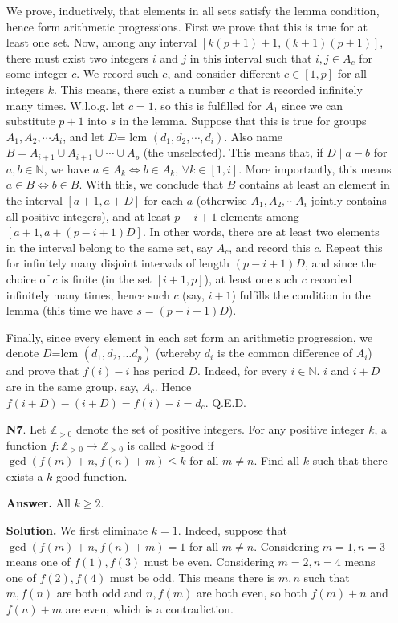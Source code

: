 \documentclass[11pt,a4paper]{article}
\begin{document}
\begin{enumerate}
We prove, inductively, that elements in all sets satisfy the lemma condition, hence form arithmetic progressions. First we prove that this is true for at least one set. Now, among any interval $[k(p+1)+1, (k+1)(p+1)]$, there must exist two integers $i$ and $j$ in this interval such that $i,j\in A_c$ for some integer $c$. We record such $c$, and consider different $c\in[1,p]$ for all integers $k$. This means, there exist a number $c$ that is recorded infinitely many times. W.l.o.g. let $c=1$, so this is fulfilled for $A_1$ since we can substitute $p+1$ into $s$ in the lemma. Suppose that this is true for groups $A_1, A_2,\cdots A_i$, and let $D$= lcm $(d_1, d_2,\cdots , d_i)$. Also name $B=A_{i+1}\cup A_{i+1}\cup\cdots\cup A_{p}$ (the unselected). This means that, if $D\mid a-b$ for $a, b\in\mathbb{N}$, we have $a\in A_{k}\Leftrightarrow b\in A_{k}$, $\forall k\in [1,i]$. More importantly, this means $a\in B\Leftrightarrow b\in B$. With this, we conclude that $B$ contains at least an element in the interval $[a+1, a+D]$ for each $a$ (otherwise $A_1, A_2,\cdots A_i$ jointly contains all positive integers), and at least $p-i+1$ elements among $[a+1, a+(p-i+1)D]$. In other words, there are at least two elements in the interval belong to the same set, say $A_c$, and record this $c$. Repeat this for infinitely many disjoint intervals of length $(p-i+1)D$, and since the choice of $c$ is finite (in the set $[i+1, p]$), at least one such $c$ recorded infinitely many times, hence such $c$ (say, $i+1$) fulfills the condition in the lemma (this time we have $s=(p-i+1)D$).

Finally, since every element in each set form an arithmetic progression, we denote $D$=lcm $(d_1, d_2,\dots d_p)$ (whereby $d_i$ is the common difference of $A_i$) and prove that $f(i)-i$ has period $D$. Indeed, for every $i\in\mathbb{N}$. $i$ and $i+D$ are in the same group, say, $A_c$. Hence $f(i+D)-(i+D)=f(i)-i=d_c$. Q.E.D. 

\item [\textbf{N7}.]
Let $\mathbb{Z}_{>0}$ denote the set of positive integers. For any positive integer $k$, a function $f: \mathbb{Z}_{>0} \to \mathbb{Z}_{>0}$ is called $k$-good if $\gcd(f(m) + n, f(n) + m) \le k$ for all $m \neq n$. Find all $k$ such that there exists a $k$-good function.

\textbf{Answer.} All $k\ge 2$. 

\textbf{Solution.} 
We first eliminate $k=1$. Indeed, suppose that $\gcd(f(m) + n, f(n) + m) = 1$ for all $m\neq n$. 
Considering $m=1, n=3$ means one of $f(1), f(3)$ must be even. 
Considering $m=2, n=4$ means one of $f(2), f(4)$ must be odd. 
This means there is $m, n$ such that $m, f(n)$ are both odd and $n, f(m)$ are both even, 
so both $f(m) + n$ and $f(n) + m$ are even, which is a contradiction. 


\end{enumerate}
\end{document}
